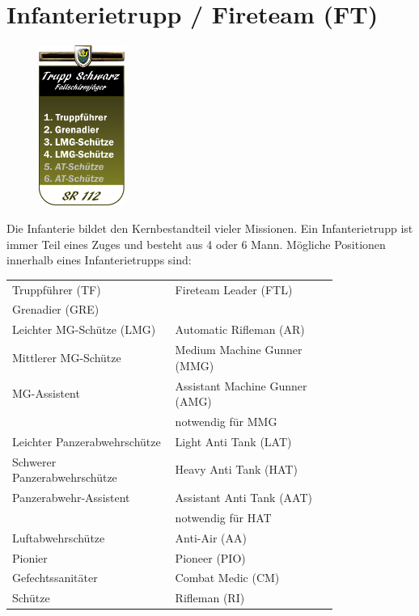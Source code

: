 \section{Infanterietrupp / Fireteam (FT)}
\begin{figure}
	\vspace{-50pt}
	\centering 
	\includegraphics[width=0.25\textwidth]{./img/truppenordnung/infanterie/infanterie}
	\vspace{-100pt}
\end{figure}
Die Infanterie bildet den Kernbestandteil vieler Missionen. Ein Infanterietrupp ist immer Teil eines Zuges und besteht aus 4 oder 6 Mann. Mögliche Positionen innerhalb eines Infanterietrupps sind:
\vspace{3.5cm}
\begin{longtable}{@{}P{0.4\linewidth}P{0.4\linewidth}@{}}

	\toprule
	Truppführer (TF) & Fireteam Leader (FTL)\\
	Grenadier (GRE) & \\
	Leichter MG-Schütze (LMG) & Automatic Rifleman (AR)\\
	Mittlerer MG-Schütze & Medium Machine Gunner (MMG) \\
	MG-Assistent & Assistant Machine Gunner (AMG)\\ 
	& notwendig für MMG\\
	Leichter Panzerabwehrschütze & Light Anti Tank (LAT)\\
	Schwerer Panzerabwehrschütze & Heavy Anti Tank (HAT)\\
	Panzerabwehr-Assistent & Assistant Anti Tank (AAT)\\ 
	& notwendig für HAT\\
	Luftabwehrschütze & Anti-Air (AA)\\
	Pionier & Pioneer (PIO)\\
	Gefechtssanitäter & Combat Medic (CM)\\
	Schütze & Rifleman (RI)\\			
	\bottomrule					
\end{longtable}


